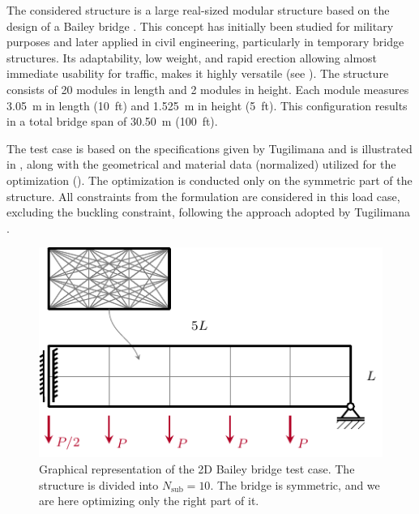 The considered structure is a large real-sized modular structure based on the design of a Bailey bridge . This concept has initially been studied for military purposes and later applied in civil engineering, particularly in temporary bridge structures. Its adaptability, low weight, and rapid erection allowing almost immediate usability for traffic, makes it highly versatile (see ). The structure consists of 20 modules in length and 2 modules in height. Each module measures \qty{3.05}{m} in length (\qty{10}{ft}) and \qty{1.525}{m} in height (\qty{5}{ft}). This configuration results in a total bridge span of \qty{30.50}{m} (\qty{100}{ft}).

The test case is based on the specifications given by Tugilimana \etal \cite{tugilimana_spatial_2017, tugilimana_integrated_2019} and is illustrated in , along with the geometrical and material data (normalized) utilized for the optimization (). The optimization is conducted only on the symmetric part of the structure. All constraints from the formulation  are considered in this load case, excluding the buckling constraint, following the approach adopted by Tugilimana \etal.


\begin{figure}
    \centering
    \includegraphics{figures/06_DMO/00_tug_bench_bcs/bcs.pdf}
    \caption{Graphical representation of the 2D Bailey bridge test case. The structure is divided into $N_\text{sub}=10$. The bridge is symmetric, and we are here optimizing only the right part of it.}
    \label{fig:06_tug_bcs}
\end{figure}

